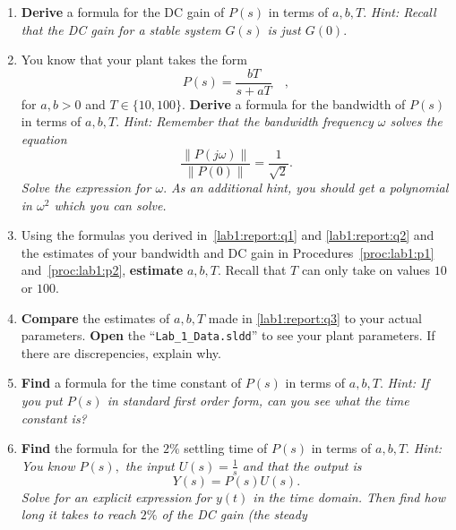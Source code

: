 \begin{deliverable}[label={lab1:report}]
  \begin{enumerate}[label={(\arabic*)}]
    \item{
      \label{lab1:report:q1}
      \textbf{Derive} a formula for the DC gain of \(P(s)\) in terms of
      \(a, b, T.\)
      \emph{Hint: Recall that the DC gain for a stable system \(G(s)\)
      is just \(G(0).\)}
    }
    \item{
      \label{lab1:report:q2}
      You know that your plant takes the form
      \[
        P(s) = \frac{b T}{s + a T}\quad ,
      \]
      for \(a, b > 0\) and \(T \in \{10, 100\}.\) \textbf{Derive} a
      formula for the bandwidth of \(P(s)\) in terms of \(a, b, T.\)
      \emph{Hint: Remember that the bandwidth frequency \(\omega\) solves
      the equation}
      \[
        \frac{\left\|P(j \omega)\right\|}{\left\|P(0)\right\|}
        =
        \frac{1}{\sqrt{2}}.
      \]
      \emph{Solve the expression for \(\omega.\) As
      an additional hint, you should get a polynomial in \(\omega^2\) which
      you can solve.}
    }
    \item{
      \label{lab1:report:q3}
      Using the formulas you derived in~\ref{lab1:report:q1} and
      \ref{lab1:report:q2} and the estimates of your bandwidth and DC gain
      in Procedures~\ref{proc:lab1:p1} and~\ref{proc:lab1:p2},
      \textbf{estimate} \(a, b, T.\) Recall that \(T\) can only take on
      values \(10\) or \(100.\)
    }
    \item{
      \label{lab1:report:q4}
      \textbf{Compare} the estimates of \(a, b, T\) made in
      \ref{lab1:report:q3} to your actual parameters.
      \textbf{Open} the ``\texttt{Lab\_1\_Data.sldd}'' to see your plant
      parameters. If there are discrepencies, explain why.
    }
    \item{
      \label{lab1:report:q5}
      \textbf{Find} a formula for the time constant of \(P(s)\) in terms of
      \(a, b, T.\) \emph{Hint: If you put \(P(s)\) in standard first order
      form, can you see what the time constant is?}
    }
    \item{
      \label{lab1:report:q6}
      \textbf{Find} the formula for the \(2\%\) settling time of \(P(s)\) in terms of \(a, b, T.\)
      \emph{Hint: You know \(P(s),\) the input \(U(s) = \frac{1}{s}\) and that
      the output is}
      \[
        Y(s) = P(s) U(s).
      \]
      \emph{Solve for an explicit expression for \(y(t)\) in the time domain.
      Then find how long it takes to reach \(2\%\) of the DC gain (the steady
}}
\end{enumerate}
\end{deliverable}
